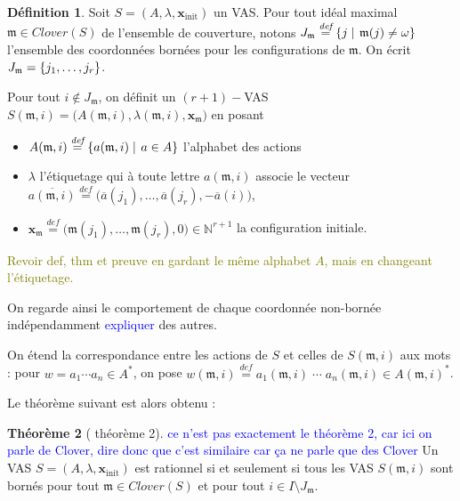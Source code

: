 \documentclass[a4paper,final]{article}
\theoremstyle{definition}
\newtheorem{Theorem}{Théorème}
\newtheorem{Definition}[Theorem]{Définition}
\newcommand{\alain}[1]{\textcolor{blue}{#1}}
\newcommand{\lucas}[1]{\textcolor{olive}{#1}}
\newcommand{\set}[2]{\left\{#1\mathrel{\left|\vphantom{#1}\vphantom{#2}\right.}#2\right\}}
\newcommand{\os}[1]{\left\{\mathinner{#1}\right\}}
\newcommand{\defeq}{\ensuremath{\stackrel{\textit{def}}{=}}}
\newcommand{\N}{\ensuremath{\mathbb{N}}}
\newcommand{\clover}{\textit{Clover}}
\newcommand{\vect}[1]{\ensuremath{\mathbf{#1}}}
\newcommand{\xinit}{\ensuremath{\vect{x}_\text{init}}}
\newcommand{\valeur}[1]{\ensuremath{\overline{#1}}}
\begin{document}
\begin{Definition}
Soit $S=(A,\lambda,\xinit)$ un VAS.
Pour tout idéal maximal $\mathfrak{m}\in\clover(S)$ de l'ensemble de couverture, notons $J_\mathfrak{m} \defeq \set{j}{\mathfrak{m}(j)\neq \omega}$ l'ensemble des coordonnées bornées pour les configurations de $\mathfrak{m}$.
On écrit $J_\mathfrak{m}=\os{j_1,\dots,j_r}$.

Pour tout $i\notin J_\mathfrak{m}$, on définit un $(r+1)-$VAS $S(\mathfrak{m},i) = \big( A(\mathfrak{m},i), \lambda(\mathfrak{m},i), \vect{x}_\mathfrak{m} \big)$ en posant
\begin{itemize}
    \item $A(\mathfrak{m},i) \defeq \set{a(\mathfrak{m},i)} {a\in A}$ 
    l'alphabet des actions
    \item $\lambda$ l'étiquetage qui à toute lettre $a(\mathfrak{m},i)$ associe le vecteur $\valeur{a(\mathfrak{m},i)} \defeq \big(\valeur{a}(j_1), \dots, \valeur{a}(j_r), -\valeur{a}(i) \big)$,
    \item $\vect{x}_\mathfrak{m} \defeq \big(\mathfrak{m}(j_1), \dots, \mathfrak{m}(j_r), 0\big) \in \N^{r+1}$ la configuration initiale.
\end{itemize}
\end{Definition}

\lucas{Revoir def, thm et preuve en gardant le même alphabet $A$, mais en changeant l'étiquetage.}

\noindent On regarde ainsi le comportement de chaque coordonnée non-bornée indépendamment \alain{expliquer} des autres.

On étend la correspondance entre les actions de $S$ et celles de $S(\mathfrak{m},i)$ aux mots : 
pour $w = a_1\cdots a_n \in A^\ast$, on pose $w(\mathfrak{m},i) \defeq a_1(\mathfrak{m},i) \;\cdots\; a_n(\mathfrak{m},i) \in A(\mathfrak{m},i)^\ast$.

Le théorème suivant est alors obtenu :

\begin{Theorem}[\cite{giyo80} théorème 2]\alain{ce n'est pas exactement le théorème 2, car ici on parle de Clover, dire donc que c'est similaire car ça ne parle que des Clover}
    Un VAS   $S=(A,\lambda,\xinit)$ est rationnel si et seulement si 
    tous les VAS $S(\mathfrak{m},i)$ sont bornés pour tout  $\mathfrak{m} \in \clover(S)$ et pour tout $i \in I \setminus J_\mathfrak{m}$.
    
\end{Theorem}
\end{document}
